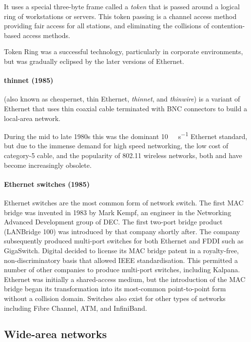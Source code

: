{It uses a special three-byte frame called a \emph{token} that is passed around a logical ring of workstations or servers.
This token passing is a channel access method providing fair access for all stations, and eliminating the collisions of contention-based access methods.

Token Ring was a successful technology, particularly in corporate environments, but was gradually eclipsed by the later versions of Ethernet.

\paragraph{thinnet (1985)}
 (also known as cheapernet, thin Ethernet, \emph{thinnet}, and \emph{thinwire}) is a variant of Ethernet that uses thin coaxial cable terminated with \acs{BNC} connectors to build a local-area network.

During the mid to late 1980s this was the dominant \SI{10}{\mega\bit\per\second} Ethernet standard, but due to the immense demand for high speed networking, the low cost of \mbox{category-5} cable, and the popularity of 802.11 wireless networks, both  and  have become increasingly obsolete.

\paragraph{Ethernet switches (1985)}
Ethernet switches are the most common form of network switch.
The first \acs{MAC} bridge was invented in 1983 by Mark Kempf, an engineer in the Networking Advanced Development group of \gls{DEC}.
The first two-port bridge product (LANBridge 100) was introduced by that company shortly after.
The company subsequently produced multi-port switches for both Ethernet and \acs{FDDI} such as GigaSwitch.
Digital decided to license its \acs{MAC} bridge patent in a royalty-free, non-dis\-crim\-i\-na\-tory basis that allowed \acs{IEEE} standardisation.
This permitted a number of other companies to produce multi-port switches, including Kalpana.
Ethernet was initially a shared-access medium, but the introduction of the \acs{MAC} bridge began its transformation into its most-common point-to-point form without a collision domain.
Switches also exist for other types of networks including Fibre Channel, \gls{ATM}, and InfiniBand.
    
\subsection{Wide-area networks}
\label{sec:network-evoluation-wan}

}
